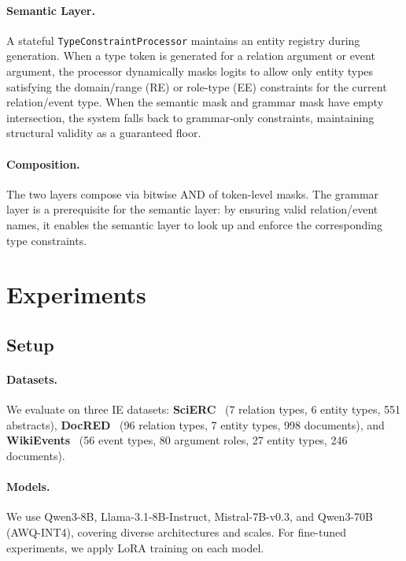 \documentclass[11pt]{article}
\begin{document}
\paragraph{Semantic Layer.}
A stateful \texttt{TypeConstraintProcessor} maintains an entity registry during generation.
When a type token is generated for a relation argument or event argument, the processor dynamically masks logits to allow only entity types satisfying the domain/range (RE) or role-type (EE) constraints for the current relation/event type.
When the semantic mask and grammar mask have empty intersection, the system falls back to grammar-only constraints, maintaining structural validity as a guaranteed floor.

\paragraph{Composition.}
The two layers compose via bitwise AND of token-level masks.
The grammar layer is a prerequisite for the semantic layer: by ensuring valid relation/event names, it enables the semantic layer to look up and enforce the corresponding type constraints.

\section{Experiments}
\label{sec:experiments}

\subsection{Setup}
\label{sec:setup}

\paragraph{Datasets.}
We evaluate on three IE datasets: \textbf{SciERC}~\citep{luan2018multi} (7 relation types, 6 entity types, 551 abstracts), \textbf{DocRED}~\citep{yao2019docred} (96 relation types, 7 entity types, 998 documents), and \textbf{WikiEvents}~\citep{li2021document} (56 event types, 80 argument roles, 27 entity types, 246 documents).

\paragraph{Models.}
We use Qwen3-8B, Llama-3.1-8B-Instruct, Mistral-7B-v0.3, and Qwen3-70B (AWQ-INT4), covering diverse architectures and scales.
For fine-tuned experiments, we apply LoRA training on each model.
\end{document}
